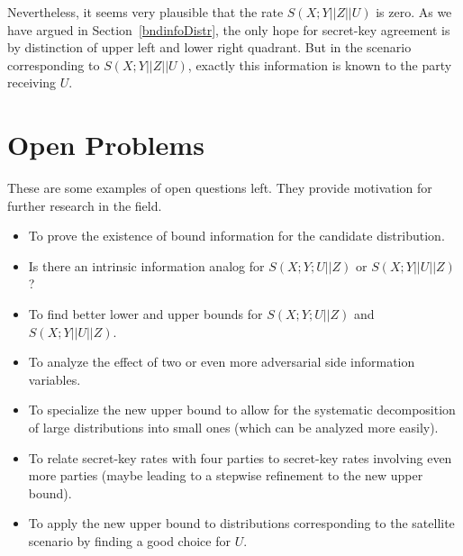 \documentclass[a4paper, twoside, openany]{report}
\theoremstyle{plain}
\theoremstyle{definition}
\begin{document}
Nevertheless, it seems very plausible that the rate $S(X;Y||Z||U)$ is zero. As we have argued in Section~\ref{bndinfoDistr}, the only hope for secret-key agreement is by distinction of upper left and lower right quadrant. But in the scenario corresponding to $S(X;Y||Z||U)$, exactly this information is known to the party receiving $U$.


\chapter{Open Problems}

These are some examples of open questions left. They provide motivation for further research in the field.

\begin{itemize}
\item To prove the existence of bound information for the candidate distribution.
\item Is there an intrinsic information analog for $S(X;Y;U||Z)$ or $S(X;Y||U||Z)$?
\item To find better lower and upper bounds for $S(X;Y;U||Z)$ and $S(X;Y||U||Z)$.
\item To analyze the effect of two or even more adversarial side information variables.
\item To specialize the new upper bound to allow for the systematic decomposition of large distributions into small ones (which can be analyzed more easily).
\item To relate secret-key rates with four parties to secret-key rates involving even more parties (maybe leading to a stepwise refinement to the new upper bound).
\item To apply the new upper bound to distributions corresponding to the satellite scenario by finding a good choice for $U$.
\end{itemize}

\end{document}
